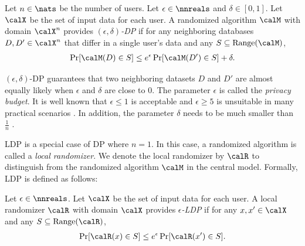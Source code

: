 \begin{definition}  \label{chap3-def:DP} 
Let $n \in \nats$ be the number of users. 
Let $\epsilon \in \nnreals$ and $\delta \in [0,1]$. 
Let $\calX$ be the set of input data for each user. 
A randomized algorithm $\calM$ with domain $\calX^n$ 
provides \emph{$(\epsilon,\delta)$-DP} if for any neighboring databases $D,D' \in \calX^n$ that differ in a single user's data and any 
$S \subseteq \mathrm{Range}(\calM)$, 
\begin{align*}
\Pr[\calM(D) \in S] \leq e^\epsilon \Pr[\calM(D') \in S] + \delta.
\end{align*}
\end{definition}
$(\epsilon,\delta)$-DP guarantees that two neighboring datasets $D$ and $D'$ are almost equally likely when $\epsilon$ and $\delta$ are close to $0$. 
The parameter $\epsilon$ is called the \textit{privacy budget}. 
It is well known that $\epsilon \leq 1$ is acceptable and $\epsilon \geq 5$ is unsuitable in many practical scenarios \cite{DP_Li}. 
In addition, the parameter $\delta$ needs to be much smaller than $\frac{1}{n}$ \cite{Barber_arXiv14,DP}. 

LDP \cite{Kasiviswanathan_FOCS08} is a special case of DP where $n=1$. 
In this case, a randomized algorithm is called a \textit{local randomizer}. 
We denote the local randomizer by $\calR$ to distinguish from the randomized algorithm $\calM$ in the central model. 
Formally, LDP is defined as follows: 
\begin{definition}  \label{chap3-def:LDP} 
Let $\epsilon \in \nnreals$. 
Let $\calX$ be the set of input data for each user. 
A local randomizer $\calR$ with domain $\calX$ 
provides \emph{$\epsilon$-LDP} if for any $x,x' \in \calX$ and any $S \subseteq \mathrm{Range}(\calR)$, 
\begin{align}
\Pr[\calR(x) \in S] \leq e^\epsilon \Pr[\calR(x') \in S].
\label{chap3-eq:LDP}
\end{align}
\end{definition}


